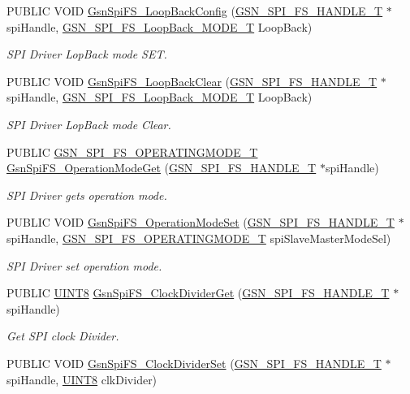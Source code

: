 \begin{DoxyCompactItemize}
PUBLIC VOID \hyperlink{a00655_gac394b037df150de051a331bc21a45d66}{GsnSpiFS\_\-LoopBackConfig} (\hyperlink{a00234}{GSN\_\-SPI\_\-FS\_\-HANDLE\_\-T} $\ast$spiHandle, \hyperlink{a00655_ga721139ec14f269f577231293b4b96dad}{GSN\_\-SPI\_\-FS\_\-LoopBack\_\-MODE\_\-T} LoopBack)
\begin{DoxyCompactList}\small\item\em SPI Driver LopBack mode SET. \end{DoxyCompactList}\item 
PUBLIC VOID \hyperlink{a00655_ga29dd85f19e47a96f7cf9afa087e6226a}{GsnSpiFS\_\-LoopBackClear} (\hyperlink{a00234}{GSN\_\-SPI\_\-FS\_\-HANDLE\_\-T} $\ast$spiHandle, \hyperlink{a00655_ga721139ec14f269f577231293b4b96dad}{GSN\_\-SPI\_\-FS\_\-LoopBack\_\-MODE\_\-T} LoopBack)
\begin{DoxyCompactList}\small\item\em SPI Driver LopBack mode Clear. \end{DoxyCompactList}\item 
PUBLIC \hyperlink{a00655_gab173e44df6afa7f56b96f3a05cb857a5}{GSN\_\-SPI\_\-FS\_\-OPERATINGMODE\_\-T} \hyperlink{a00655_ga3245efe23f9fe2d50dec14bb095616d5}{GsnSpiFS\_\-OperationModeGet} (\hyperlink{a00234}{GSN\_\-SPI\_\-FS\_\-HANDLE\_\-T} $\ast$spiHandle)
\begin{DoxyCompactList}\small\item\em SPI Driver gets operation mode. \end{DoxyCompactList}\item 
PUBLIC VOID \hyperlink{a00655_gae3fcac3d6cd6790d11fcc2c53f1c8e67}{GsnSpiFS\_\-OperationModeSet} (\hyperlink{a00234}{GSN\_\-SPI\_\-FS\_\-HANDLE\_\-T} $\ast$spiHandle, \hyperlink{a00655_gab173e44df6afa7f56b96f3a05cb857a5}{GSN\_\-SPI\_\-FS\_\-OPERATINGMODE\_\-T} spiSlaveMasterModeSel)
\begin{DoxyCompactList}\small\item\em SPI Driver set operation mode. \end{DoxyCompactList}\item 
PUBLIC \hyperlink{a00660_gab27e9918b538ce9d8ca692479b375b6a}{UINT8} \hyperlink{a00655_ga53ad601dfca672c1500549b1d954229f}{GsnSpiFS\_\-ClockDividerGet} (\hyperlink{a00234}{GSN\_\-SPI\_\-FS\_\-HANDLE\_\-T} $\ast$spiHandle)
\begin{DoxyCompactList}\small\item\em Get SPI clock Divider. \end{DoxyCompactList}\item 
PUBLIC VOID \hyperlink{a00655_ga916d8712ea792188f5a9140cf5936f25}{GsnSpiFS\_\-ClockDividerSet} (\hyperlink{a00234}{GSN\_\-SPI\_\-FS\_\-HANDLE\_\-T} $\ast$spiHandle, \hyperlink{a00660_gab27e9918b538ce9d8ca692479b375b6a}{UINT8} clkDivider)

\end{DoxyCompactItemize}
